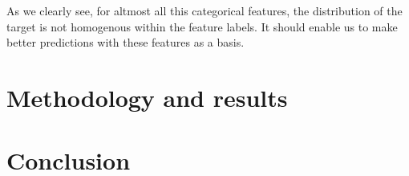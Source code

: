 \documentclass[11pt]{article}
\begin{document}
As we clearly see, for altmost all this categorical features, the distribution of the target is not homogenous within the feature labels. It should enable us to make better predictions with these features as a basis.

\section{Methodology and results}
\section{Conclusion}
\end{document}
